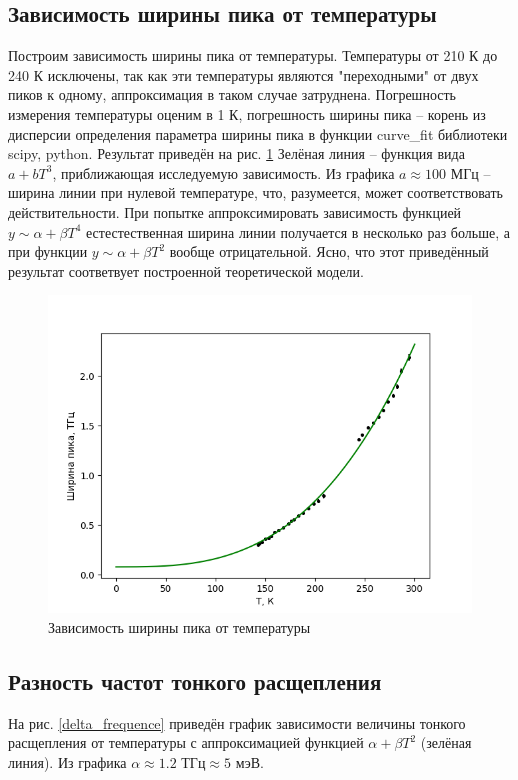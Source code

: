 \subsection{Зависимость ширины пика от температуры}
Построим зависимость ширины пика от температуры. Температуры от 210 К до 240 К 
исключены, так как эти температуры являются "переходными" от двух пиков к одному,
аппроксимация в таком случае затруднена. Погрешность измерения температуры оценим в
1 К, погрешность ширины пика -- корень из дисперсии определения параметра ширины пика 
в функции curve\_fit библиотеки scipy, python. Результат приведён на рис. \ref{peak_width}
Зелёная линия -- функция вида $a + bT^3$, приближающая исследуемую зависимость. 
Из графика $a \approx 100 \text{ МГц}$ -- ширина линии при нулевой температуре, что, разумеется,
может соответствовать действительности. При попытке аппроксимировать зависимость
функцией $y \sim \alpha + \beta T^4$ естестественная ширина линии получается в несколько
раз больше, а при функции $y \sim \alpha + \beta T^2$ вообще отрицательной. 
Ясно, что этот приведённый результат соответвует построенной теоретической модели. 

\begin{figure}[!h]
    \begin{center}
        \includegraphics[width=0.9 \linewidth]{peak_width.png}
        \caption{Зависимость ширины пика от температуры}
        \label{peak_width}
    \end{center}
\end{figure}


\subsection{Разность частот тонкого расщепления}
На рис. \ref{delta_frequence} приведён график зависимости величины тонкого
расщепления от температуры с аппроксимацией функцией $\alpha + \beta T^2$ (зелёная
линия). Из графика $\alpha \approx 1.2 \text{ ТГц} \approx 5 \text{ мэВ}$. 


